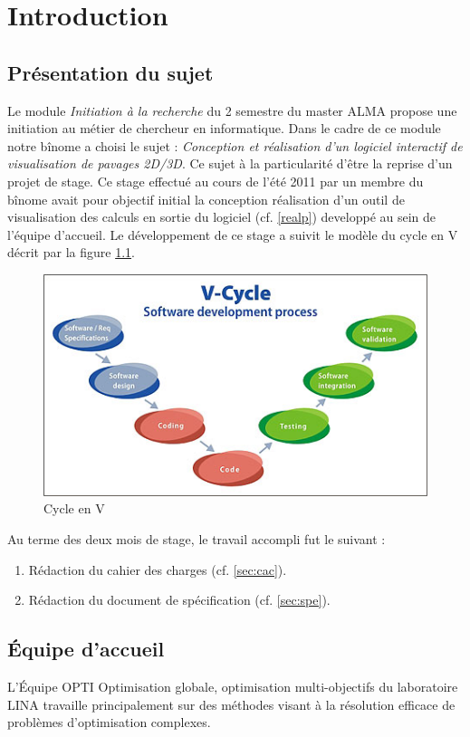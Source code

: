 \chapter{Introduction}

\section{Présentation du sujet}
Le module \emph{Initiation à la recherche} du 2 semestre du master \textsc{ALMA} propose une initiation au métier de chercheur en informatique. Dans le cadre de ce module notre bînome a choisi le sujet : \emph{Conception et réalisation d’un logiciel interactif de visualisation de pavages 2D/3D}. Ce sujet à la particularité d'être la reprise d'un projet de stage. Ce stage effectué au cours de l'été 2011 par un membre du bînome avait pour objectif initial la conception réalisation d'un outil de visualisation des calculs en sortie du logiciel  \realpaver (cf. \ref{realp}) developpé au sein de l'équipe d'accueil. Le développement de ce stage a suivit le modèle du cycle en V décrit par la figure \ref{fig:vcycle}.
\begin{figure}[htbp]
\centering
\includegraphics[scale=1]{img/vcycle}
\caption{Cycle en V}
\label{fig:vcycle}
\end{figure}
\clearpage
Au terme des deux mois de stage, le travail accompli fut le suivant :
\begin{enumerate}
\item 
Rédaction du cahier des charges (cf. \ref{sec:cac}).
\item
Rédaction du document de spécification (cf. \ref{sec:spe}).
\end{enumerate} 

\section{\'Equipe d'accueil}
L'\'Equipe \textsc{OPTI} Optimisation globale, optimisation multi-objectifs\cite{opti} du laboratoire \textsc{LINA}\cite{lina} travaille principalement sur des méthodes visant à la résolution efficace de problèmes d’optimisation complexes.  
